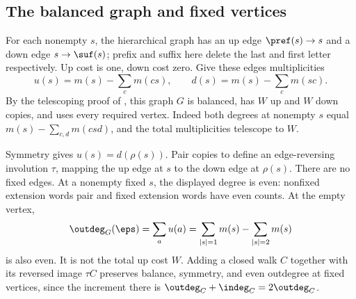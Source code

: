 \subsection{The balanced graph and fixed vertices}\label{sec:base}
For each nonempty $s$, the hierarchical graph has an up edge
$\pref(s)\to s$ and a down edge $s\to\suf(s)$; prefix and suffix
here delete the last and first letter respectively. Up cost is one,
down cost zero. Give these edges multiplicities
\begin{equation}\label{eq:multiplicities}
u(s)=m(s)-\sum_c m(cs),\qquad d(s)=m(s)-\sum_c m(sc).
\end{equation}
By the telescoping proof of , this graph $G$ is
balanced, has $W$ up and $W$ down copies, and uses every required vertex.
Indeed both degrees at nonempty $s$ equal
$m(s)-\sum_{c,d}m(csd)$, and the total multiplicities telescope to $W$.

Symmetry gives $u(s)=d(\rho(s))$. Pair copies to define an
edge-reversing involution $\tau$, mapping the up edge at $s$ to the
down edge at $\rho(s)$. There are no fixed edges. At a nonempty fixed
$s$, the displayed degree is even: nonfixed extension words pair and
fixed extension words have even counts. At the empty vertex,
\begin{equation}\label{eq:empty-degree}
\outdeg_G(\eps)=\sum_a u(a)
=\sum_{|s|=1}m(s)-\sum_{|s|=2}m(s)
\end{equation}
is also even. It is not the total up cost $W$. Adding a closed walk
$C$ together with its reversed image $\tau C$ preserves balance,
symmetry, and even outdegree at fixed vertices, since the increment
there is $\outdeg_C+\indeg_C=2\outdeg_C$.
